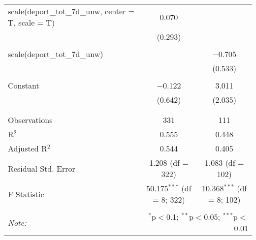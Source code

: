 \begin{table}[!htbp]
\begin{tabular}{@{\extracolsep{5pt}}lcc}
 scale(deport\_tot\_7d\_unw, center = T, scale = T) & 0.070 &  \\ 
  & (0.293) &  \\ 
  & & \\ 
 scale(deport\_tot\_7d\_unw) &  & $-$0.705 \\ 
  &  & (0.533) \\ 
  & & \\ 
 Constant & $-$0.122 & 3.011 \\ 
  & (0.642) & (2.035) \\ 
  & & \\ 
\hline \\[-1.8ex] 
Observations & 331 & 111 \\ 
R$^{2}$ & 0.555 & 0.448 \\ 
Adjusted R$^{2}$ & 0.544 & 0.405 \\ 
Residual Std. Error & 1.208 (df = 322) & 1.083 (df = 102) \\ 
F Statistic & 50.175$^{***}$ (df = 8; 322) & 10.368$^{***}$ (df = 8; 102) \\ 
\hline 
\hline \\[-1.8ex] 
\textit{Note:}  & \multicolumn{2}{r}{$^{*}$p$<$0.1; $^{**}$p$<$0.05; $^{***}$p$<$0.01} \\ 
\end{tabular} 
\end{table} 

